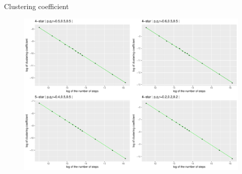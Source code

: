 \begin{block}{Clustering coefficient}
\begin{figure}
\includegraphics[width=0.8\linewidth]{./fig/csillclustlog4.pdf}
\end{figure}
\end{block}
